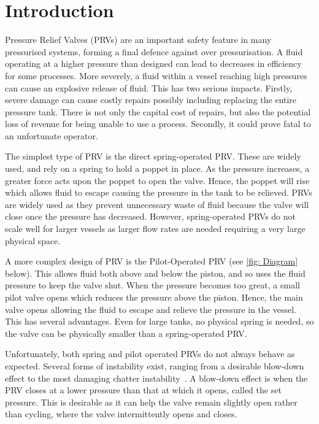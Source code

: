 \section{Introduction}

Pressure Relief Valves (PRVs) are an important safety feature in many pressurised systems, forming a final defence against over pressurisation. A fluid operating at a higher pressure than designed can lead to decreases in efficiency for some processes. More severely, a fluid within a vessel reaching high pressures can cause an explosive release of fluid. This has two serious impacts. Firstly, severe damage can cause costly repairs possibly including replacing the entire pressure tank. There is not only the capital cost of repairs, but also the potential loss of revenue for being unable to use a process. Secondly, it could prove fatal to an unfortunate operator.

The simplest type of PRV is the direct spring-operated PRV. These are widely used, and rely on a spring to hold a poppet in place. As the pressure increases, a greater force acts upon the poppet to open the valve. Hence, the poppet will rise which allows fluid to escape causing the pressure in the tank to be relieved. PRVs are widely used as they prevent unnecessary waste of fluid because the valve will close once the pressure has decreased. However, spring-operated PRVs do not scale well for larger vessels as larger flow rates are needed requiring a very large physical space.

A more complex design of PRV is the Pilot-Operated PRV (see \cref{fig: Diagram} below). This allows fluid both above and below the piston, and so uses the fluid pressure to keep the valve shut. When the pressure becomes too great, a small pilot valve opens which reduces the pressure above the piston. Hence, the main valve opens allowing the fluid to escape and relieve the pressure in the vessel. This has several advantages. Even for large tanks, no physical spring is needed, so the valve can be physically smaller than a spring-operated PRV.

Unfortunately, both spring and pilot operated PRVs do not always behave as expected. Several forms of instability exist, ranging from a desirable blow-down effect to the most damaging chatter instability~\cite{Hos2017DynamicRecommendations}. A blow-down effect is when the PRV closes at a lower pressure than that at which it opens, called the set pressure. This is desirable as it can help the valve remain slightly open rather than cycling, where the valve intermittently opens and closes.

